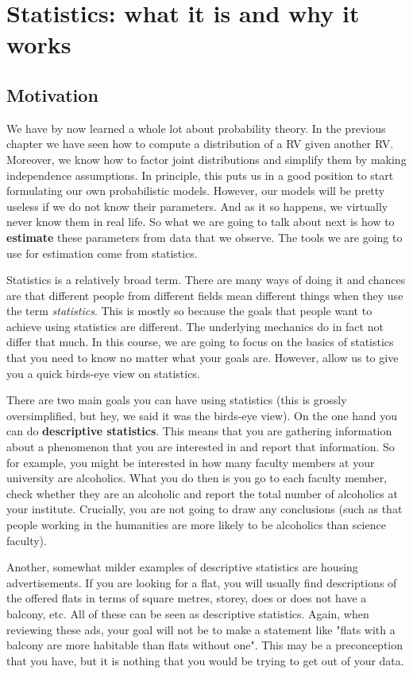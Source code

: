 \chapter{Statistics: what it is and why it works}

\section{Motivation}

We have by now learned a whole lot about probability theory. In the previous chapter we have seen
how to compute a distribution of a RV given another RV. Moreover, we know how to factor joint distributions and simplify them by making
independence assumptions. In principle, this puts us in a good position to start formulating our
own probabilistic models. However, our models will be pretty useless if we do not know their parameters. And as
it so happens, we virtually never know them in real life. So what we are going to talk about next is how to \textbf{estimate}
these parameters from data that we observe. The tools we are going to use for estimation come from statistics.

Statistics is a relatively broad term. There are many ways of doing it and chances are that different people from different
fields mean different things when they use the term \textit{statistics}. This is mostly so because the goals that people 
want to achieve using statistics are different. The underlying mechanics do in fact not differ that much. In this course,
we are going to focus on the basics of statistics that you need to know no matter what your goals are. However, allow us
to give you a quick birds-eye view on statistics. 

There are two main goals you can have using statistics (this is grossly oversimplified, but hey, we said it was the birds-eye
view). On the one hand you can do \textbf{descriptive statistics}. This means that you are gathering information about a phenomenon
that you are interested in and report that information. So for example, you might be interested in how many faculty members
at your university are alcoholics. What you do then is you go to each faculty member, check whether they are an alcoholic
and report the total number of alcoholics at your institute. Crucially, you are not going to draw any conclusions (such as that people working in the humanities are more
likely to be alcoholics than science faculty).

Another, somewhat milder examples of descriptive statistics are housing advertisements. If you are looking for a flat, you will usually
find descriptions of the offered flats in terms of square metres, storey, does or does not have a balcony, etc. All of these
can be seen as descriptive statistics. Again, when reviewing these ads, your goal will not be to make a statement like "flats
with a balcony are more habitable than flats without one". This may be a preconception that you have, but it is nothing that
you would be trying to get out of your data.

